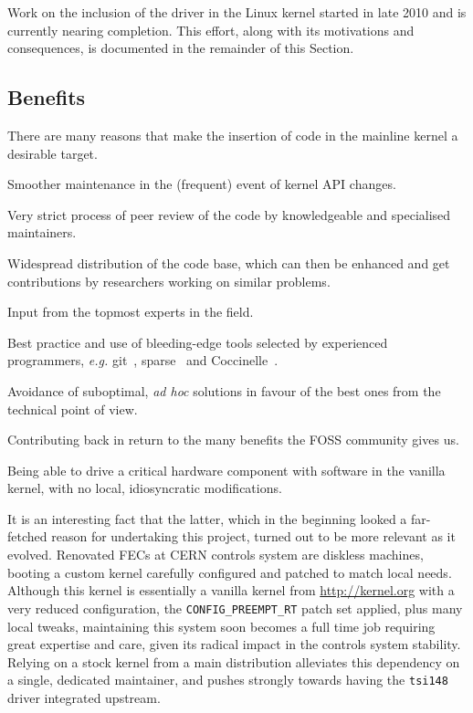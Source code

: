 \documentclass{JAC2003}
\begin{document}
Work on the inclusion of the driver in the Linux kernel started in late
2010 and is currently nearing completion. This effort, along with its
motivations and consequences, is documented in the remainder of this
Section.

\subsection{Benefits}

There are many reasons that make the insertion of code in the mainline kernel
a desirable target.

\begin{Itemize}
\item Smoother maintenance in the (frequent) event of kernel API
  changes.~\cite{stable-api-nonsense}
\item Very strict process of peer review of the code by knowledgeable
    and specialised maintainers.
\item Widespread distribution of the code base, which can then be
    enhanced and get contributions by researchers working on similar
    problems.
\item Input from the topmost experts in the field.
\item Best practice and use of bleeding-edge tools selected by
    experienced programmers, \emph{e.g.} git~\cite{git}, sparse~\cite{sparse}
    and Coccinelle~\cite{coccinelle}.
\item Avoidance of suboptimal, \emph{ad hoc} solutions in favour of the
    best ones from the technical point of view.
\item Contributing back in return to the many benefits the FOSS community
    gives us.
\item Being able to drive a critical hardware component with software
    in the vanilla kernel, with no local, idiosyncratic modifications.
\end{Itemize}

It is an interesting fact that the latter, which in the beginning looked
a far-fetched reason for undertaking this project, turned out to be
more relevant as it evolved. Renovated FECs at CERN controls system
are diskless machines, booting a custom kernel carefully configured and
patched to match local needs. Although this kernel is essentially a vanilla
kernel from \url{http://kernel.org} with a very reduced configuration, the
\verb|CONFIG_PREEMPT_RT| patch set applied, plus many local tweaks, maintaining
this system soon becomes a full time job requiring great expertise and care,
given its radical impact in the controls system stability. Relying on a
stock kernel from a main distribution alleviates this dependency on a single,
dedicated maintainer, and pushes strongly towards having the \texttt{tsi148}
driver integrated upstream.
\end{document}
